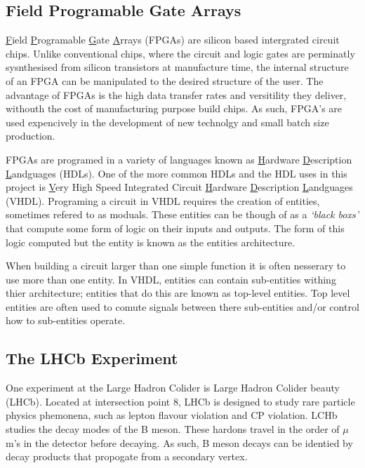   \subsection{Field Programable Gate Arrays}

    \underline{F}ield \underline{P}rogramable \underline{G}ate \underline{A}rrays (FPGAs) are silicon based intergrated circuit chips.
    Unlike conventional chips, where the circuit and logic gates are perminatly sysnthesised from silicon transistors at manufacture time, the internal structure of an FPGA can be manipulated to the desired structure of the user.
    The advantage of FPGAs is the high data transfer rates and versitility they deliver, withouth the cost of manufacturing purpose build chips. 
    As such, FPGA's are used expencively in the development of new technolgy and small batch size production. \cite{fpga}
    \par
    FPGAs are programed in a variety of languages known as \underline{H}ardware \underline{D}escription \underline{L}andguages (HDLs).
    One of the more common HDLs and the HDL uses in this project is \underline{V}ery High Speed Integrated Circuit \underline{H}ardware \underline{D}escription \underline{L}andguages (VHDL).
    Programing a circuit in VHDL requires the creation of entities, sometimes refered to as moduals.
    These entities can be though of as a \textit{`black boxs'} that compute some form of logic on their inputs and outputs.
    The form of this logic computed but the entity is known as the entities architecture.
    \par
    When building a circuit larger than one simple function it is often nesserary to use more than one entity.
    In VHDL, entities can contain sub-entities withing thier architecture; entities that do this are known as top-level entities.
    Top level entities are often used to comute signals between there sub-entities and/or control how to sub-entities operate.

  \subsection{The LHCb Experiment}

    One experiment at the Large Hadron Colider is Large Hadron Colider beauty (LHCb).
    Located at intersection point 8, LHCb is designed to study rare particle physics phemonena, such as lepton flavour violation and CP violation. 
    LCHb studies the decay modes of the B meson.
    These hardons travel in the order of $\mu$m's in the detector before decaying. 
    As such, B meson decays can be identied by decay products that propogate from a secondary vertex.

